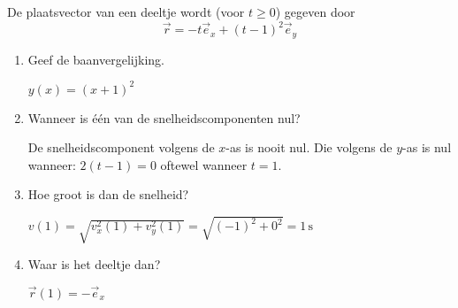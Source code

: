 
\begin{exercise}





 De plaatsvector van een deeltje wordt (voor $t\geq0$) gegeven door
\begin{equation*}
	\vec{r}=-t\vec{e}_x+(t-1)^2\vec{e}_y
\end{equation*}
\begin{enumerate}
\item Geef de baanvergelijking.

\begin{oplossing}
	$y(x)=(x+1)^2$
\end{oplossing}

\item Wanneer is \'e\'en van de snelheidscomponenten nul?

\begin{oplossing}
	De snelheidscomponent volgens de $x$-as is nooit nul. Die volgens de $y$-as is nul wanneer: $2(t-1)=0$ oftewel wanneer $t=1$.
\end{oplossing}

\item Hoe groot is dan de snelheid?

\begin{oplossing}
	$v(1)=\sqrt{v_x^2(1)+v_y^2(1)}=\sqrt{(-1)^2+0^2}=1\,\text{s}$
\end{oplossing}

\item Waar is het deeltje dan?

\begin{oplossing}
	$\vec{r}(1)=-\vec{e}_x$
\begin{center}
\end{center}
\end{oplossing}


\end{enumerate}
\end{exercise}
